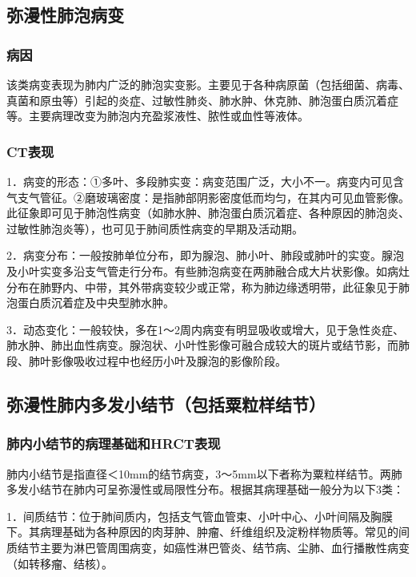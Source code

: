 \subsection{弥漫性肺泡病变}

\subsubsection{病因}

该类病变表现为肺内广泛的肺泡实变影。主要见于各种病原菌（包括细菌、病毒、真菌和原虫等）引起的炎症、过敏性肺炎、肺水肿、休克肺、肺泡蛋白质沉着症等。主要病理改变为肺泡内充盈浆液性、脓性或血性等液体。

\subsubsection{CT表现}

1．病变的形态：①多叶、多段肺实变：病变范围广泛，大小不一。病变内可见含气支气管征。②磨玻璃密度：是指肺部阴影密度低而均匀，在其内可见血管影像。此征象即可见于肺泡性病变（如肺水肿、肺泡蛋白质沉着症、各种原因的肺泡炎、过敏性肺泡炎等），也可见于肺间质性病变的早期及活动期。

2．病变分布：一般按肺单位分布，即为腺泡、肺小叶、肺段或肺叶的实变。腺泡及小叶实变多沿支气管走行分布。有些肺泡病变在两肺融合成大片状影像。如病灶分布在肺野内、中带，其外带病变较少或正常，称为肺边缘透明带，此征象见于肺泡蛋白质沉着症及中央型肺水肿。

3．动态变化：一般较快，多在1～2周内病变有明显吸收或增大，见于急性炎症、肺水肿、肺出血性病变。腺泡状、小叶性影像可融合成较大的斑片或结节影，而肺段、肺叶影像吸收过程中也经历小叶及腺泡的影像阶段。

\subsection{弥漫性肺内多发小结节（包括粟粒样结节）}

\subsubsection{肺内小结节的病理基础和HRCT表现}

肺内小结节是指直径＜10mm的结节病变，3～5mm以下者称为粟粒样结节。两肺多发小结节在肺内可呈弥漫性或局限性分布。根据其病理基础一般分为以下3类：

1．间质结节：位于肺间质内，包括支气管血管束、小叶中心、小叶间隔及胸膜下。其病理基础为各种原因的肉芽肿、肿瘤、纤维组织及淀粉样物质等。常见的间质结节主要为淋巴管周围病变，如癌性淋巴管炎、结节病、尘肺、血行播散性病变（如转移瘤、结核）。

